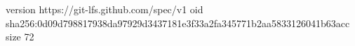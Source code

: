 version https://git-lfs.github.com/spec/v1
oid sha256:0d09d798817938da97929d3437181e3f33a2fa345771b2aa5833126041b63acc
size 72
